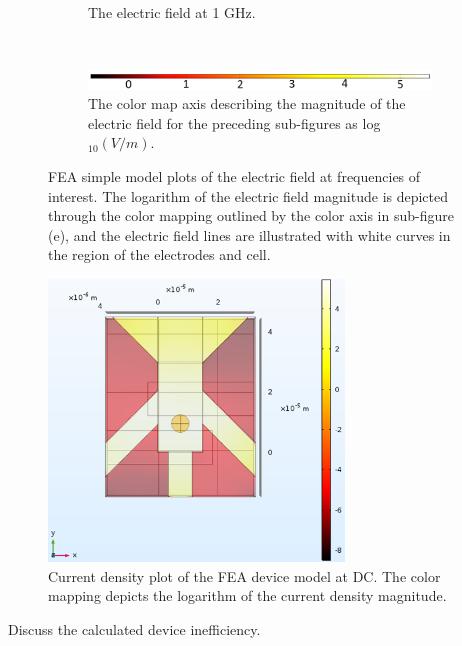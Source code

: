 \begin{figure}[h]
\begin{subfigure}[b]{\textwidth}
        \caption{The electric field at 1 GHz.}
    \end{subfigure}
        \\
    \vspace{0.1 in}
    \begin{subfigure}[b]{\textwidth}
        \centering
        \includegraphics[width=\textwidth]{images/simpleCellColorMapAxis.png}
        \caption{The color map axis describing the magnitude of the electric field for the preceding sub-figures as log$_{10}(V/m)$.}
    \end{subfigure}
    \caption[FEA simple model electric field surface plot.]{FEA simple model plots of the electric field at frequencies of interest. The logarithm of the electric field magnitude is depicted through the color mapping outlined by the color axis in sub-figure (e), and the electric field lines are illustrated with white curves in the region of the electrodes and cell.}
    \label{fig:single_cell_model_EZ_plots}
\end{figure}

\begin{figure}[h]
    \centering
    \includegraphics[width=0.7\textwidth]{images/deviceCellCurrent1Hz.png}
    \caption[Current density plot of the FEA device model.]{Current density plot of the FEA device model at DC. The color mapping depicts the logarithm of the current density magnitude.}
    \label{fig:device_current_denisty plot}
\end{figure}

Discuss the calculated device inefficiency.

